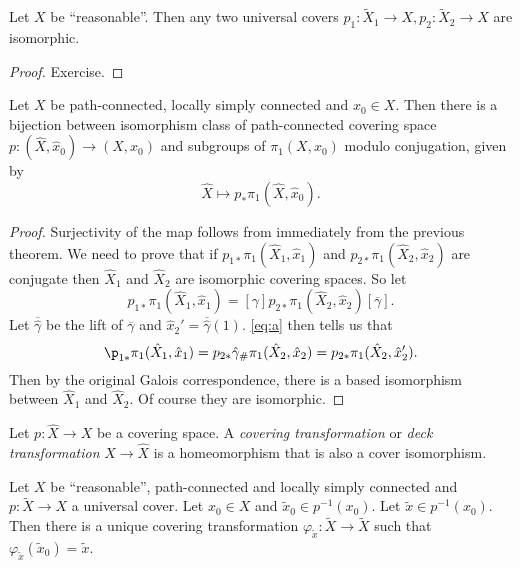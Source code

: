 \documentclass[a4paper]{article}
\begin{document}
\begin{corollary}
  Let \(X\) be ``reasonable''. Then any two universal covers \(p_1: \tilde X_1 \to X, p_2: \tilde X_2 \to X\) are isomorphic.
\end{corollary}

\begin{proof}
  Exercise.
\end{proof}


\begin{corollary}
  Let \(X\) be path-connected, locally simply connected and \(x_0 \in X\). Then there is a bijection between isomorphism class of path-connected covering space \(p: (\hat X, \hat x_0) \to (X, x_0)\) and subgroups of \(\pi_1(X, x_0)\) modulo conjugation, given by
  \[
    \hat X \mapsto p_*\pi_1(\hat X, \hat x_0).
  \]
\end{corollary}

\begin{proof}
  Surjectivity of the map follows from immediately from the previous theorem. We need to prove that if \(p_{1*}\pi_1(\hat X_1, \hat x_1)\) and \(p_{2*}\pi_1(\hat X_2, \hat x_2)\) are conjugate then \(\hat X_1\) and \(\hat X_2\) are isomorphic covering spaces. So let
  \[
    \label{eq:a}
    p_{1*} \pi_1(\hat X_1, \hat x_1) = [\gamma] p_{2*} \pi_1(\hat X_2, \hat x_2) [\overline \gamma].
    \tag{\ast}
  \]
  Let \(\overline{\hat \gamma}\) be the lift of \(\overline \gamma\) and \(\hat x_2' = \overline{\hat \gamma}(1)\). \eqref{eq:a} then tells us that
  \[
    \p_{1*}\pi_1(\hat X_1, \hat x_1)
    = p_{2*} \hat \gamma_\# \pi_1(\hat X_2, \hat x_2)
    = p_{2*} \pi_1(\hat X_2, \hat x_2').
  \]
  Then by the original Galois correspondence, there is a based isomorphism between \(\hat X_1\) and \(\hat X_2\). Of course they are isomorphic.
\end{proof}

\begin{definition}
  Let \(p: \hat X \to X\) be a covering space. A \emph{covering transformation} or \emph{deck transformation} \(\hat X \to \hat X\) is a homeomorphism that is also a cover isomorphism.
\end{definition}

\begin{corollary}
  Let \(X\) be ``reasonable'', path-connected and locally simply connected and \(p: \tilde X \to X\) a universal cover. Let \(x_0 \in X\) and \(\tilde x_0 \in p^{-1}(x_0)\). Let \(\tilde x \in p^{-1}(x_0)\). Then there is a unique covering transformation \(\varphi_{\tilde x} : \tilde X \to \tilde X\) such that \(\varphi_{\tilde x}(\tilde x_0) = \tilde x\).
\end{corollary}
\end{document}
